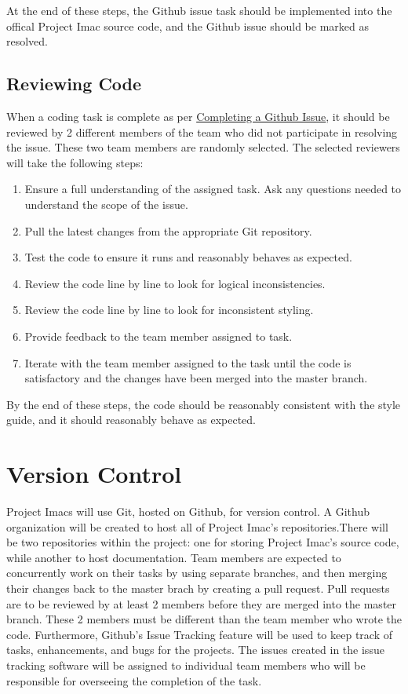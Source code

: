 \documentclass{article}
\begin{document}
At the end of these steps, the Github issue task should be implemented into the offical Project Imac source code, and the Github issue should be marked as resolved.

\subsection{Reviewing Code}
\label{sec:reviewing-code}
When a coding task is complete as per \hyperref[sec:github-issue]{Completing a Github Issue}, it should be reviewed by 2 different members of the team who did not participate in resolving the issue. These two team members are randomly selected. The selected reviewers will take the following steps:

\begin{enumerate}
\item Ensure a full understanding of the assigned task. Ask any questions needed to understand the scope of the issue.
\item Pull the latest changes from the appropriate Git repository.
\item Test the code to ensure it runs and reasonably behaves as expected.
\item Review the code line by line to look for logical inconsistencies.
\item Review the code line by line to look for inconsistent styling.
\item Provide feedback to the team member assigned to task.
\item Iterate with the team member assigned to the task until the code is satisfactory and the changes have been merged into the master branch.
\end{enumerate}

By the end of these steps, the code should be reasonably consistent with the style guide, and it should reasonably behave as expected.

\section{Version Control}
\label{sec:version-control}
Project Imacs will use Git, hosted on Github, for version control. A Github organization will be created to host all of Project Imac's repositories.There will be two repositories within the project: one for storing Project Imac's source code, while another to host documentation. Team members are expected to concurrently work on their tasks by using separate branches, and then merging their changes back to the master brach by creating a pull request. Pull requests are to be reviewed by at least 2 members before they are merged into the master branch. These 2 members must be different than the team member who wrote the code. Furthermore, Github's Issue Tracking feature will be used to keep track of tasks, enhancements, and bugs for the projects. The issues created in the issue tracking software will be assigned to individual team members who will be responsible for overseeing the completion of the task.
\end{document}
